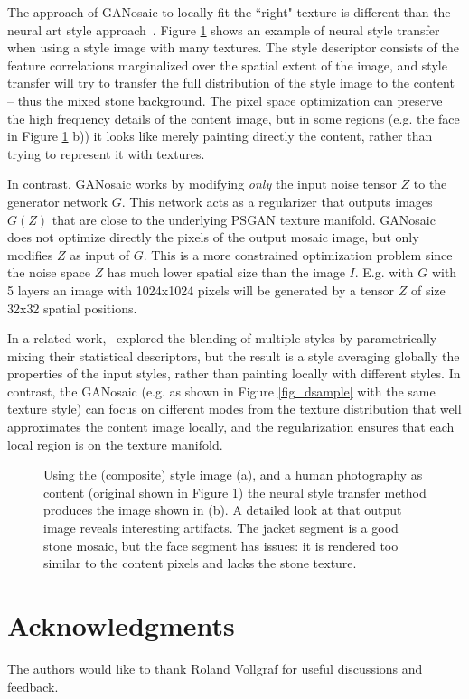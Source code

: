 \documentclass{article}
\begin{document}
The approach of GANosaic to locally fit the ``right" texture is different than the neural art style approach~\cite{GatysEB15a}. Figure \ref{fig_gatys} shows an example of neural style transfer when using a style image with many textures. The style descriptor consists of the feature correlations marginalized over the spatial extent of the image, and %
style transfer will try to transfer the full distribution of the style image to the content -- thus the mixed stone background. 
The pixel space optimization can preserve the high frequency details of the content image, but in some regions (e.g. the face in Figure \ref{fig_gatys} b)) it looks like merely painting directly the content, rather than trying to represent it with textures.

In contrast, GANosaic works by modifying \textit{only} the input noise tensor $Z$ to the generator network $G$. This network acts as a regularizer that outputs images $G(Z)$ that are close to the underlying PSGAN texture manifold. GANosaic does not optimize directly the pixels of the output mosaic image, but only modifies $Z$ as input of $G$. This is a more constrained optimization problem since the noise space $Z$ has much lower spatial size than the image $I$. E.g. with $G$ with 5 layers an image with 1024x1024 pixels will be generated by a tensor $Z$ of size 32x32 spatial positions.

In a related work,~\cite{DumoulinSK16} explored the blending of multiple styles by parametrically mixing their statistical descriptors, but the result is a style averaging globally the properties of the input styles, rather than painting locally with different styles.  
In contrast, the GANosaic (e.g. as shown in Figure \ref{fig_dsample} with the same texture style) can focus on different modes from the texture distribution that well approximates the content image locally, and the regularization ensures that each local region is on the texture manifold.

\begin{figure}
\centering
{}
\vspace{-0.3cm}
\caption{Using the (composite) style image (a), and a human photography as content (original shown in Figure 1) the neural style transfer method produces the image shown in (b). A detailed look at that output image reveals interesting artifacts. The jacket segment is a good stone mosaic, but the face segment has issues: it is rendered too similar to the content pixels and lacks the stone texture. }\label{fig_gatys}
\end{figure}

\newpage
\section*{Acknowledgments}
The authors would like to thank Roland Vollgraf for useful discussions and feedback.


\end{document}
